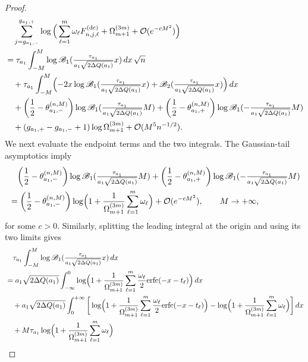 \documentclass[a4paper]{article}
\newcommand{\erfc}{{\rm erfc}}
\numberwithin{equation}{section}
\begin{document}
\begin{proof}
\begin{align*}
&\quad 
    \sum_{j=g_{a_1,-}}^{g_{a_1,+}}
        \log\Big( 
\sum_{\ell=1}^{m}\omega_{\ell}F_{n,j,\ell}^{(\mathrm{dc})}
+\Omega_{m+1}^{(3m)}+\mathcal{O}(e^{-cM^2})
\Bigr)
\\
&=
\tau_{a_1}\int_{-M}^{M}\log \mathscr{B}_{1}(\tfrac{\tau_{a_1}}{a_1\sqrt{2\Delta Q(a_1)}}x)\,dx
\,\sqrt{n}
\\
&\quad+
\tau_{a_1}
\int_{-M}^{M}
\Bigl( 
-2x\log \mathscr{B}_{1}(\tfrac{\tau_{a_1}}{a_1\sqrt{2\Delta Q(a_1)}}x)
+\mathscr{B}_{2}(\tfrac{\tau_{a_1}}{a_1\sqrt{2\Delta Q(a_1)}}x)
\Bigr)\,dx
\\
&\quad
+ \bigg( \frac{1}{2}-\theta_{a_1,-}^{(n,M)} \bigg)\log \mathscr{B}_{1}(\tfrac{\tau_{a_1}}{a_1\sqrt{2\Delta Q(a_1)}}M)+ \bigg( \frac{1}{2}-\theta_{a_1,+}^{(n,M)} \bigg)\log \mathscr{B}_{1}(-\tfrac{\tau_{a_1}}{a_1\sqrt{2\Delta Q(a_1)}}M)
\\
&\quad
+
(g_{a_1,+}-g_{a_1,-}+1)\log \Omega_{m+1}^{(3m)}
+
\mathcal{O}(M^5n^{-1/2}). 
\end{align*}
We next evaluate the endpoint terms and the two integrals.  The Gaussian-tail
asymptotics imply
\begin{align*}
&\quad 
 \bigg( \frac{1}{2}-\theta_{a_1,-}^{(n,M)} \bigg)\log\mathscr{B}_{1}(\tfrac{\tau_{a_1}}{a_1\sqrt{2\Delta Q(a_1)}}M)+ \bigg( \frac{1}{2}-\theta_{a_1,+}^{(n,M)} \bigg)\log\mathscr{B}_{1}(-\tfrac{\tau_{a_1}}{a_1\sqrt{2\Delta Q(a_1)}}M)
 \\
 &=\bigg( \frac{1}{2}-\theta_{a_1,-}^{(n,M)} \bigg)\log\Bigl( 
1+\frac{1}{\Omega_{m+1}^{(3m)}}\sum_{\ell=1}^{m}\omega_{\ell}
\Bigr)+\mathcal{O}(e^{-cM^2}),\qquad M\to+\infty, 
\end{align*}
for some $c>0$. 
Similarly, splitting the leading integral at the origin and using its two
limits gives
\begin{align*}
&\quad
\tau_{a_1}\int_{-M}^{M}\log \mathscr{B}_{1}(\tfrac{\tau_{a_1}}{a_1\sqrt{2\Delta Q(a_1)}}x)\,dx
\\
&=
a_1\sqrt{2\Delta Q(a_1)}\int_{-\infty}^{0}
\log\Bigl( 
1+\frac{1}{\Omega_{m+1}^{(3m)}}\sum_{\ell=1}^{m}\frac{\omega_{\ell}}{2}
\erfc(-x-t_{\ell})
\Bigr)\,dx
\\
&\quad
+
a_1\sqrt{2\Delta Q(a_1)}\int_{0}^{+\infty}
\bigg[
\log\Bigl( 
1+\frac{1}{\Omega_{m+1}^{(3m)}}\sum_{\ell=1}^{m}\frac{\omega_{\ell}}{2}
\erfc(-x-t_{\ell})
\Bigr)
-
\log\Bigl(1+\frac{1}{\Omega_{m+1}^{(3m)}}\sum_{\ell=1}^{m}\omega_{\ell}\Bigr)
\bigg]
\,dx
\\
&\quad
+
M\tau_{a_1}\log\Bigl(1+\frac{1}{\Omega_{m+1}^{(3m)}}\sum_{\ell=1}^{m}\omega_{\ell}\Bigr)

\end{align*}
\end{proof}
\end{document}
